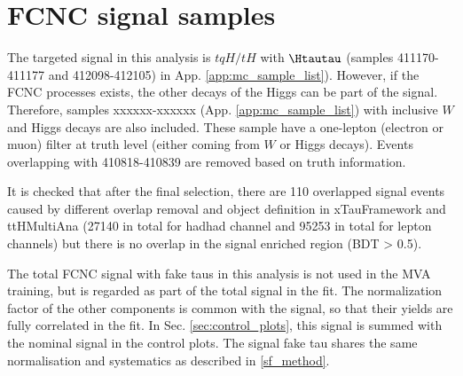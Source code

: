 \section{FCNC signal samples}
\label{sec:fcncbkg}

The targeted signal in this analysis is $tqH/tH$ with $\Htautau$ (samples 411170-411177 and 412098-412105) in App. \ref{app:mc_sample_list}).
However, if the FCNC processes exists, the other decays of the Higgs can be part of the signal.
Therefore, samples xxxxxx-xxxxxx (App. \ref{app:mc_sample_list}) with inclusive $W$ and Higgs decays are also included. These sample have a one-lepton (electron or muon) filter at truth level (either coming from $W$ or Higgs decays). Events overlapping with 410818-410839 are removed based on truth information.

It is checked that after the final selection, there are 110 overlapped signal events caused by different overlap removal and object definition in xTauFramework and ttHMultiAna (27140 in total for hadhad channel and 95253 in total for lepton channels) but there is no overlap in the signal enriched region (BDT > 0.5).

The total FCNC signal with fake taus in this analysis is not used in the MVA training, but is regarded as part of the total signal in the fit. The normalization factor of the other components is common with the signal, so that their yields are fully correlated in the fit. In Sec. \ref{sec:control_plots}, this signal is summed with the nominal signal in the control plots. The signal fake tau shares the same normalisation and systematics as described in \ref{sf_method}.


